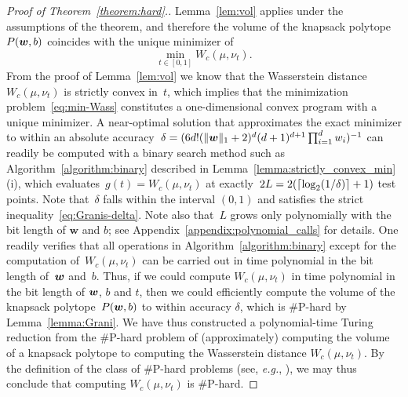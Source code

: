 \documentclass[11pt, a4paper, oneside, reqno]{article}
\begin{document}
	\begin{proof}[Proof of Theorem~\ref{theorem:hard}.]
		Lemma~\ref{lem:vol} applies under the assumptions of the theorem, and therefore the volume of the knapsack polytope~$P(\boldsymbol{w}, b)$ coincides with the unique minimizer of
		\begin{equation}
		\label{eq:min-Wass}
		\min_{ t  \in [0,1]} W_c(\mu,  {\nu}_ t ).
		\end{equation}
		{\color{black} From the proof of Lemma~\ref{lem:vol} we know that the Wasserstein distance $W_c(\mu,{\nu}_ t )$ is strictly convex in~$t$, which implies that the minimization problem~\eqref{eq:min-Wass} constitutes a one-dimensional convex program with a unique minimizer. A near-optimal solution that approximates the exact minimizer to within an absolute accuracy~$\delta=(6d!(\|\boldsymbol{w}\|_1+2)^d(d+1)^{d+1}\prod_{i = 1}^{d}w_i)^{-1}$ can readily be computed with a binary search method such as  Algorithm~\ref{algorithm:binary} described in Lemma~\ref{lemma:strictly_convex_min}\,(i), which evaluates~$g(t)=W_c(\mu,\nu_t)$ at exactly~$2L=2(\lceil\log_2(1/\delta)\rceil + 1)$ test points. Note that~$\delta$ falls within the interval $(0, 1)$ and satisfies the strict inequality~\eqref{eq:Granis-delta}. Note also that~$L$ grows only polynomially with the bit length of $\bm w$ and $b$; see Appendix~\ref{appendix:polynomial_calls} for details. One readily verifies that all operations in Algorithm~\ref{algorithm:binary} except for the computation of~$W_c(\mu, \nu_t)$ can be carried out in time polynomial in the bit length of~$\boldsymbol{w}$ and~$b$.} Thus, if we could compute $W_c(\mu, \nu_t)$ in time polynomial in the bit length of $\boldsymbol{w}$, $b$ and $t$, then we could efficiently compute the volume of the knapsack polytope~$P( \boldsymbol{w}, b)$ to within accuracy $\delta$, which is $\#$P-hard by Lemma~\ref{lemma:Grani}. We have thus constructed a polynomial-time Turing reduction from the $\#$P-hard problem of (approximately) computing the volume of a knapsack polytope to computing the Wasserstein distance $W_c(\mu,  {\nu}_ t )$. By the definition of the class of $\#$P-hard problems (see, {\em e.g.}, \citep[Definition~1]{ref:van1990handbook}), we may thus conclude that computing $W_c(\mu, \nu_t)$ is $\#$P-hard.
	\end{proof}  
\end{document}

